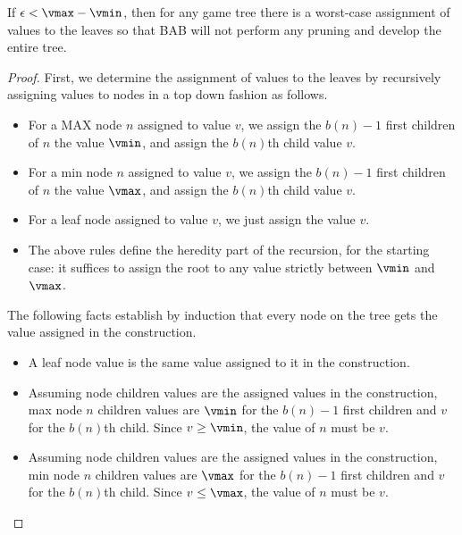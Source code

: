 \begin{theorem}
If $\epsilon < \vmax - \vmin$, then for any 
game tree there is a worst-case assignment of values to the leaves so that BAB will not perform any pruning and 
develop the entire tree. 
\label{the:worst}
\end{theorem}
\begin{proof}
First, we determine the assignment of values to the leaves by recursively assigning values to nodes in a top down fashion as follows.

\begin{itemize}
  \item For a MAX node $n$ assigned to value $v$, we assign the $b(n)-1$ first children of $n$ the value $\vmin$, and assign the $b(n)$th child value $v$.
  \item For a min node $n$ assigned to value $v$, we assign the $b(n)-1$ first children of $n$ the value $\vmax$, and assign the $b(n)$th child value $v$.
  \item For a leaf node assigned to value $v$, we just assign the value $v$.
  \item The above rules define the heredity part of the recursion, for the starting case: it suffices to assign the root to any value strictly between $\vmin$ and $\vmax$.
\end{itemize}

The following facts establish by induction that every node on the tree gets the value assigned in the construction.
\begin{itemize}
  \item A leaf node value is the same value assigned to it in the construction.  
  \item Assuming node children values are the assigned values in the construction, max node $n$ children values are $\vmin$ for the $b(n)-1$ first children and $v$ for the $b(n)$th child. Since $v \geq \vmin$, the value of $n$ must be $v$.
    \item Assuming node children values are the assigned values in the construction, min node $n$ children values are $\vmax$ for the $b(n)-1$ first children and $v$ for the $b(n)$th child. Since $v \leq \vmax$, the value of $n$ must be $v$.
\end{itemize}


\end{proof}
